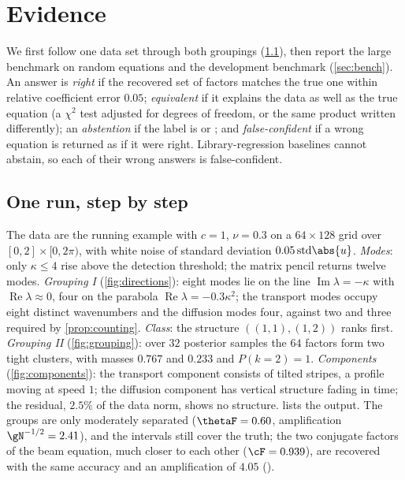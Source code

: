 \section{Evidence}\label{sec:evidence}
We first follow one data set through both groupings (\cref{sec:worked}), then report the large benchmark on random
equations and the development benchmark (\cref{sec:bench}). An answer is \emph{right} if the recovered set of factors
matches the true one within relative coefficient error $0.05$; \emph{equivalent} if it explains the data as well as the
true equation (a $\chi^2$ test adjusted for degrees of freedom, or the same product written differently); an
\emph{abstention} if the label is \IDK{} or \UND; and \emph{false-confident} if a wrong equation is returned as if it
were right. Library-regression baselines cannot abstain, so each of their wrong answers is false-confident.

\subsection{One run, step by step}\label{sec:worked}
The data are the running example with $c=1$, $\nu=0.3$ on a $64\times128$ grid over $[0,2]\times[0,2\pi)$, with white
noise of standard deviation $0.05\,\mathrm{std}\abs{u}$. \emph{Modes}: only $\kappa\le4$ rise above the detection
threshold; the matrix pencil returns twelve modes. \emph{Grouping I} (\cref{fig:directions}): eight modes lie on the line
$\operatorname{Im}\lambda=-\kappa$ with $\operatorname{Re}\lambda\approx0$, four on the parabola $\operatorname{Re}\lambda=-0.3\kappa^2$;
the transport modes occupy eight distinct wavenumbers and the diffusion modes four, against two and three required by
\cref{prop:counting}. \emph{Class}: the structure $((1,1),(1,2))$ ranks first. \emph{Grouping II}
(\cref{fig:grouping}): over $32$ posterior samples the $64$ factors form two tight clusters, with masses $0.767$ and
$0.233$ and $P(k=2)=1$. \emph{Components} (\cref{fig:components}): the transport component consists of tilted stripes, a
profile moving at speed $1$; the diffusion component has vertical structure fading in time; the residual, $2.5\%$ of the
data norm, shows no structure.  lists the output. The groups are only moderately separated
($\thetaF=0.60$, amplification $\gN^{-1/2}=2.41$), and the intervals still cover the truth; the two conjugate factors of
the beam equation, much closer to each other ($\cF=0.939$), are recovered with the same accuracy and an amplification of
$4.05$ (\SMcases).

